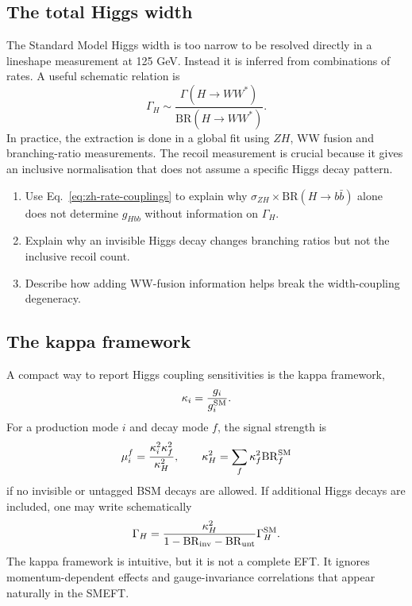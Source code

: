 \documentclass[11pt,a4paper]{article}
\newcommand{\BR}{\mathrm{BR}}
\numberwithin{equation}{section}
\begin{document}
\subsection{The total Higgs width}
The Standard Model Higgs width is too narrow to be resolved directly in a lineshape measurement at 125 GeV. Instead it is inferred from combinations of rates. A useful schematic relation is
\begin{equation}
  \Gamma_H \sim \frac{\Gamma(H\to WW^*)}{\BR(H\to WW^*)} .
\end{equation}
In practice, the extraction is done in a global fit using \(ZH\), WW fusion and branching-ratio measurements. The recoil measurement is crucial because it gives an inclusive normalisation that does not assume a specific Higgs decay pattern.

\begin{guidedchecksbox}
\begin{enumerate}[leftmargin=1.6em]
\item Use Eq.~\eqref{eq:zh-rate-couplings} to explain why \(\sigma_{ZH}\times\BR(H\to b\bar b)\) alone does not determine \(g_{Hbb}\) without information on \(\Gamma_H\).
\item Explain why an invisible Higgs decay changes branching ratios but not the inclusive recoil count.
\item Describe how adding WW-fusion information helps break the width-coupling degeneracy.
\end{enumerate}
\end{guidedchecksbox}

\subsection{The kappa framework}
A compact way to report Higgs coupling sensitivities is the kappa framework,
\begin{equation}
  \kappa_i = \frac{g_i}{g_i^{\rm SM}} .
\end{equation}
For a production mode \(i\) and decay mode \(f\), the signal strength is
\begin{equation}
  \mu_i^f = \frac{\kappa_i^2\kappa_f^2}{\kappa_H^2},
  \qquad
  \kappa_H^2=\sum_f \kappa_f^2\BR_f^{\rm SM}
\end{equation}
if no invisible or untagged BSM decays are allowed. If additional Higgs decays are included, one may write schematically
\begin{equation}
  \Gamma_H = \frac{\kappa_H^2}{1-\BR_{\rm inv}-\BR_{\rm unt}}\Gamma_H^{\rm SM} .
  \label{eq:kappa-width-bsm}
\end{equation}
The kappa framework is intuitive, but it is not a complete EFT. It ignores momentum-dependent effects and gauge-invariance correlations that appear naturally in the SMEFT.
\end{document}
